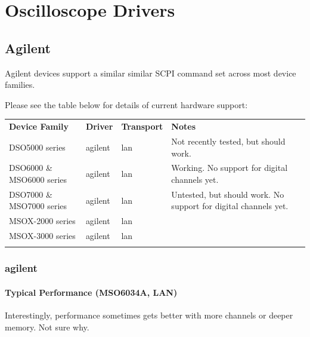 \chapter{Oscilloscope Drivers}
\label{sec:scope-drivers}

\section{Agilent}

Agilent devices support a similar similar SCPI command set across most device families.

Please see the table below for details of current hardware support:

\begin{tabularx}{16cm}{lllX}
\thickhline
\textbf{Device Family} & \textbf{Driver} & \textbf{Transport} & \textbf{Notes} \\
\thickhline
DSO5000 series & agilent & lan & Not recently tested, but should work.\\
\thinhline
DSO6000 \& MSO6000 series & agilent & lan &  Working. No support for digital channels yet.\\
\thinhline
DSO7000 \& MSO7000 series & agilent & lan & Untested, but should work. No support for digital channels yet.\\
\thinhline
MSOX-2000 series & agilent & lan \\
\thinhline
MSOX-3000 series & agilent & lan \\
\thickhline
\end{tabularx}

\subsection{agilent}

\subsubsection{Typical Performance (MSO6034A, LAN)}

Interestingly, performance sometimes gets better with more channels or deeper memory. Not sure why.

